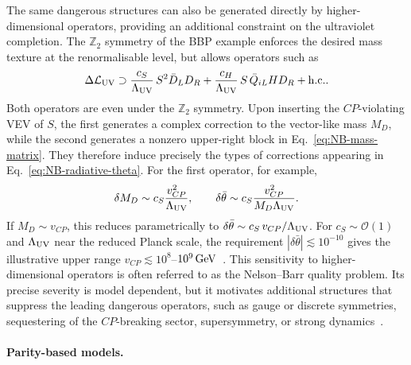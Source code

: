 \documentclass[review]{elsarticle}
\numberwithin{equation}{section}
\numberwithin{table}{section}
\numberwithin{figure}{section}
\def\hc{{\rm h.c.}}
\begin{document}
The same dangerous structures can also be generated directly by higher-dimensional operators, providing an additional constraint on the ultraviolet completion. The $\mathbb Z_2$ symmetry of the BBP example enforces the desired mass texture at the renormalisable level, but allows operators such as
\begin{align}
    \Delta\mathcal{L}_{\rm UV}
    \supset 
    \frac{c_S}{\Lambda_{\rm UV}}\, S^2\bar D_LD_R
    + \frac{c_H}{\Lambda_{\rm UV}}\, S\,\bar Q_{iL}H D_R
    +\hc .
    \label{eq:NB-higher-dimensional}
\end{align}
Both operators are even under the $\mathbb Z_2$ symmetry. Upon inserting the $CP$-violating VEV of $S$, the first generates a complex correction to the vector-like mass $M_D$, while the second generates a nonzero upper-right block in Eq.~\eqref{eq:NB-mass-matrix}. They therefore induce precisely the types of corrections appearing in Eq.~\eqref{eq:NB-radiative-theta}. For the first operator, for example,
\begin{align}
    \delta M_D \sim c_S\frac{v_{CP}^2}{\Lambda_{\rm UV}},
    \qquad
    \delta\bar\theta \sim c_S\frac{v_{CP}^2} {M_D\Lambda_{\rm UV}}.
    \label{eq:NB-quality-estimate-general}
\end{align}
If $M_D\sim v_{CP}$, this reduces parametrically to $\delta\bar\theta\sim c_S\, v_{CP}/\Lambda_{\rm UV}$. For $c_S\sim\mathcal{O}(1)$ and $\Lambda_{\rm UV}$ near the reduced Planck scale, the requirement $|\delta\bar\theta|\lesssim10^{-10}$ gives the illustrative upper range $v_{CP}\lesssim10^8$--$10^9\,{\rm GeV}$~\cite{Dine:2015jga}. This sensitivity to higher-dimensional operators is often referred to as the Nelson--Barr quality problem. Its precise severity is model dependent, but it motivates additional structures that suppress the leading dangerous operators, such as gauge or discrete symmetries, sequestering of the $CP$-breaking sector, supersymmetry, or strong dynamics~\cite{Dine:2015jga,Vecchi:2014hpa}.

\paragraph{Parity-based models.}
\end{document}
